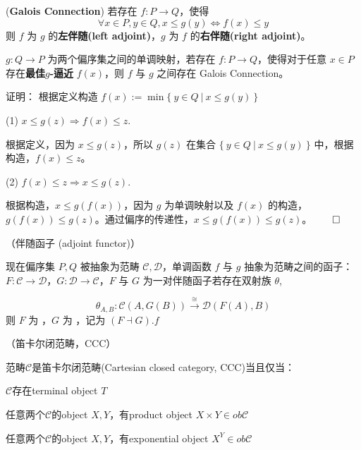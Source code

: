 \begin{defn} (\textbf{Galois Connection})
若存在 $f : P \rightarrow Q$，使得 
\[ \forall x \in P, y \in Q, x \le g(y) \Longleftrightarrow f(x) \le y \]
则 $f$ 为 $g$ 的\textbf{左伴随(left adjoint)}，$g$ 为 $f$ 的\textbf{右伴随(right adjoint)}。
\end{defn}

\begin{thm} $g : Q \rightarrow P$ 为两个偏序集之间的单调映射，若存在 $f : P \rightarrow Q$，使得对于任意 $x \in P$ 存在\textbf{最佳$g$-逼近} $f(x)$，则 $f$ 与 $g$ 之间存在 Galois Connection。\\
\end{thm}

证明：
根据定义构造 $f(x) := \min \{\ y \in Q\ |\ x \le g(y)\ \}$

(1) $x \le g(z) \Rightarrow f(x) \le z$.

根据定义，因为 $ x \le g(z)$，所以 $g(z)$ 在集合 $\{\ y \in Q\ |\ x \le g(y)\ \}$ 中，根据构造，$f(x) \le z$。

(2) $f(x) \le z \Rightarrow x \le g(z)$.

根据构造，$x \le g(f(x))$，因为 $g$ 为单调映射以及 $f(x)$ 的构造，$g(f(x)) \le g(z)$。通过偏序的传递性，$x \le g(f(x)) \le g(z)$。$\qed$


\begin{defn} （伴随函子 (adjoint functor)）

现在偏序集 $P, Q$ 被抽象为范畴 $\mathcal{C}, \mathcal{D}$，单调函数 $f$ 与 $g$ 抽象为范畴之间的函子：$F : \mathcal{C} \rightarrow \mathcal{D}$，$G : \mathcal{D} \rightarrow \mathcal{C}$，$F$ 与 $G$ 为一对伴随函子若存在双射族 $\theta$,

\[ \theta_{A,B} : \mathcal{C}(A,G(B)) \overset{\cong}\longrightarrow \mathcal{D}(F(A),B)\]
则 $F$ 为 ，$G$ 为 ，记为 $(F \dashv G).f$

\end{defn}

\begin{defn}（笛卡尔闭范畴，CCC）

范畴$\mathcal{C}$是笛卡尔闭范畴(Cartesian closed category, CCC)当且仅当：

\begin{tightenum}
  \item $\mathcal{C}$存在terminal object $T$
  \item 任意两个$\mathcal{C}$的object $X, Y$，有product object $X \times Y \in ob\mathcal{C}$
  \item 任意两个$\mathcal{C}$的object $X, Y$，有exponential object $X^Y \in ob\mathcal{C}$
\end{tightenum}
\end{defn}
